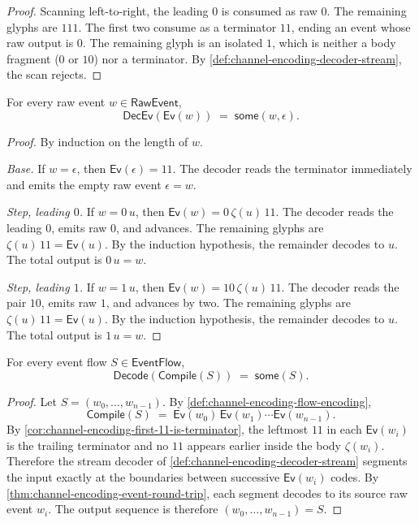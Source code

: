 \begin{proof}
Scanning left-to-right, the leading $0$ is consumed as raw $0$. The remaining glyphs are $111$. The first two consume as a terminator $11$, ending an event whose raw output is $0$. The remaining glyph is an isolated $1$, which is neither a body fragment ($0$ or $10$) nor a terminator. By \autoref{def:channel-encoding-decoder-stream}, the scan rejects.
\end{proof}

\begin{theorem}
\label{thm:channel-encoding-event-round-trip}
For every raw event $w \in \mathsf{RawEvent}$,
$$
  \mathsf{DecEv}(\mathsf{Ev}(w)) \;=\; \mathsf{some}(w,\epsilon).
$$
\end{theorem}

\begin{proof}
By induction on the length of $w$.

\emph{Base.} If $w = \epsilon$, then $\mathsf{Ev}(\epsilon) = 11$. The decoder reads the terminator immediately and emits the empty raw event $\epsilon = w$.

\emph{Step, leading $0$.} If $w = 0\,u$, then $\mathsf{Ev}(w) = 0\,\zeta(u)\,11$. The decoder reads the leading $0$, emits raw $0$, and advances. The remaining glyphs are $\zeta(u)\,11 = \mathsf{Ev}(u)$. By the induction hypothesis, the remainder decodes to $u$. The total output is $0\,u = w$.

\emph{Step, leading $1$.} If $w = 1\,u$, then $\mathsf{Ev}(w) = 10\,\zeta(u)\,11$. The decoder reads the pair $10$, emits raw $1$, and advances by two. The remaining glyphs are $\zeta(u)\,11 = \mathsf{Ev}(u)$. By the induction hypothesis, the remainder decodes to $u$. The total output is $1\,u = w$.
\end{proof}

\begin{theorem}
\label{thm:channel-encoding-flow-round-trip}
For every event flow $S \in \mathsf{EventFlow}$,
$$
  \mathsf{Decode}(\mathsf{Compile}(S)) \;=\; \mathsf{some}(S).
$$
\end{theorem}

\begin{proof}
Let $S = (w_{0}, \ldots, w_{n-1})$. By \autoref{def:channel-encoding-flow-encoding},
$$
  \mathsf{Compile}(S)
  \;=\;
  \mathsf{Ev}(w_{0})\,\mathsf{Ev}(w_{1}) \cdots \mathsf{Ev}(w_{n-1}).
$$
By \autoref{cor:channel-encoding-first-11-is-terminator}, the leftmost $11$ in each $\mathsf{Ev}(w_{i})$ is the trailing terminator and no $11$ appears earlier inside the body $\zeta(w_{i})$. Therefore the stream decoder of \autoref{def:channel-encoding-decoder-stream} segments the input exactly at the boundaries between successive $\mathsf{Ev}(w_{i})$ codes. By \autoref{thm:channel-encoding-event-round-trip}, each segment decodes to its source raw event $w_{i}$. The output sequence is therefore $(w_{0}, \ldots, w_{n-1}) = S$.
\end{proof}

